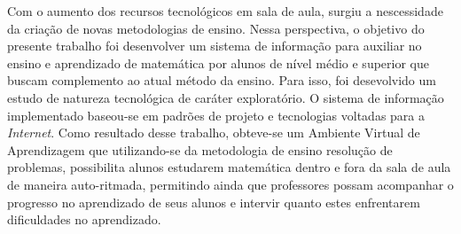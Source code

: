 Com o aumento dos recursos tecnológicos em sala de aula, surgiu a nescessidade da criação de novas metodologias de ensino. Nessa perspectiva, o objetivo do presente trabalho foi desenvolver um sistema de informação para auxiliar no ensino e aprendizado de matemática por alunos de nível médio e superior que buscam complemento ao atual método da ensino. Para isso, foi desevolvido um estudo de natureza tecnológica de caráter exploratório. O sistema de informação implementado baseou-se em padrões de projeto e tecnologias voltadas para a \textit{Internet}. Como resultado desse trabalho, obteve-se um Ambiente Virtual de Aprendizagem que utilizando-se da metodologia de ensino resolução de problemas, possibilita alunos estudarem matemática dentro e fora da sala de aula de maneira auto-ritmada, permitindo ainda que professores possam acompanhar o progresso no aprendizado de seus alunos e intervir quanto estes enfrentarem dificuldades no aprendizado.   


